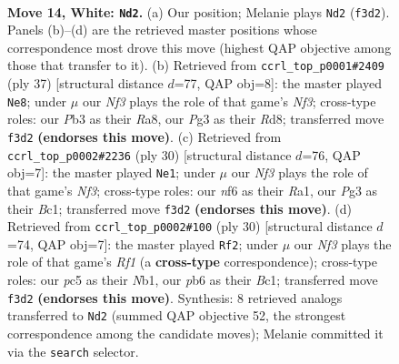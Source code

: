 \documentclass[11pt]{article}
\begin{document}
\clearpage

\begin{figure}[p]\centering
\begin{subfigure}{0.46\textwidth}\centering
\resizebox{\linewidth}{!}{%
\newchessgame
\chessboard[
  setfen={rnb2rk1/6b1/1p2pnp1/p1p2p1p/2P5/1P3NP1/P3PPBP/R1BNR1K1 w - - 0 14},
  showmover=false,
  pgfstyle=straightmove, color=movearrow, markmove={f3-d2}
]}
\caption{}
\end{subfigure}\hfill
\begin{subfigure}{0.46\textwidth}\centering
\resizebox{\linewidth}{!}{%
\newchessgame
\chessboard[
  setfen={r1br2k1/p1p1ppbp/1pP2n2/2p1P2p/5P2/2N3P1/PP4BP/R1B2RK1 b - - 0 19},
  showmover=false,
  pgfstyle=straightmove, color=movearrow, markmove={f6-e8}
]}
\caption{}
\end{subfigure}
\\[4pt]
\begin{subfigure}{0.46\textwidth}\centering
\resizebox{\linewidth}{!}{%
\newchessgame
\chessboard[
  setfen={r3kb1r/1p2npp1/4p2p/3pP2P/pn1P4/5N1R/PP2NPP1/R1B2K2 w kq - 0 16},
  showmover=false,
  pgfstyle=straightmove, color=movearrow, markmove={f3-e1}
]}
\caption{}
\end{subfigure}\hfill
\begin{subfigure}{0.46\textwidth}\centering
\resizebox{\linewidth}{!}{%
\newchessgame
\chessboard[
  setfen={r3kb1r/1bp4p/ppn3p1/4Pp2/3p1P2/3P4/PPP3PP/RNB1NRK1 w kq - 1 16},
  showmover=false,
  pgfstyle=straightmove, color=movearrow, markmove={f1-f2}
]}
\caption{}
\end{subfigure}
\caption{\textbf{Move 14, White: \texttt{Nd2}.} (a) Our position; Melanie plays \texttt{Nd2} (\texttt{f3d2}). Panels (b)--(d) are the retrieved master positions whose correspondence most drove this move (highest QAP objective among those that transfer to it). (b) Retrieved from \texttt{ccrl\_top\_p0001\#2409} (ply 37) [structural distance $d$=77, QAP obj=8]: the master played \texttt{Ne8}; under $\mu$ our \emph{Nf3} plays the role of that game's \emph{Nf3}; cross-type roles: our \emph{P}b3 as their \emph{R}a8, our \emph{P}g3 as their \emph{R}d8; transferred move \texttt{f3d2} \textbf{(endorses this move)}. (c) Retrieved from \texttt{ccrl\_top\_p0002\#2236} (ply 30) [structural distance $d$=76, QAP obj=7]: the master played \texttt{Ne1}; under $\mu$ our \emph{Nf3} plays the role of that game's \emph{Nf3}; cross-type roles: our \emph{n}f6 as their \emph{R}a1, our \emph{P}g3 as their \emph{B}c1; transferred move \texttt{f3d2} \textbf{(endorses this move)}. (d) Retrieved from \texttt{ccrl\_top\_p0002\#100} (ply 30) [structural distance $d$=74, QAP obj=7]: the master played \texttt{Rf2}; under $\mu$ our \emph{Nf3} plays the role of that game's \emph{Rf1} (a \textbf{cross-type} correspondence); cross-type roles: our \emph{p}c5 as their \emph{N}b1, our \emph{p}b6 as their \emph{B}c1; transferred move \texttt{f3d2} \textbf{(endorses this move)}. Synthesis: 8 retrieved analogs transferred to \texttt{Nd2} (summed QAP objective 52, the strongest correspondence among the candidate moves); Melanie committed it via the \texttt{search} selector.}
\label{fig:thought-m26}
\end{figure}
\end{document}
